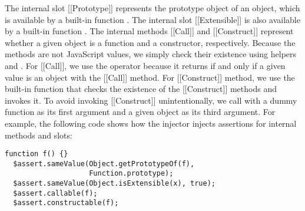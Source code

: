 The internal slot [[Prototype]] represents the prototype object of an object,
which is available by a built-in function .
The internal slot [[Extensible]] is also available by a built-in function .
The internal methods [[Call]] and [[Construct]] represent whether a given object is
a function and a constructor, respectively.  Because the methods are not JavaScript values,
we simply check their existence using helpers 
and .  For [[Call]], we use the  operator because it returns
 if and only if a given value is an object with the [[Call]] method.
For [[Construct]] method, we use the  
built-in function that checks the existence of the [[Construct]] methods and invokes it.
To avoid invoking [[Construct]] unintentionally, we call  with
a dummy function  as its first argument and 
a given object as its third argument.  For example, the following code shows
how the injector injects assertions for internal methods and slots:
\begin{lstlisting}[style=myJSstyle]
  function f() {}
  $assert.sameValue(Object.getPrototypeOf(f),
                    Function.prototype);
  $assert.sameValue(Object.isExtensible(x), true);
  $assert.callable(f);
  $assert.constructable(f);
\end{lstlisting}
